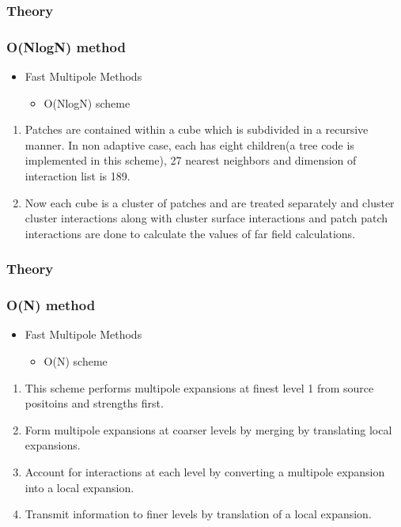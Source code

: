 \documentclass{beamer}
\begin{document}
\begin{frame}
\frametitle{Theory}
\subsubsection{O(NlogN) method}
\begin{itemize}
\item Fast Multipole Methods
\begin{itemize}
\item O(NlogN) scheme
\end{itemize}
\end{itemize}
\begin{enumerate}
\item Patches are contained within a cube which is subdivided in a recursive manner. In non adaptive case, each has eight children(a tree code is implemented in this scheme), 27 nearest neighbors and dimension of interaction list is 189.
\item Now each cube is a cluster of patches and are treated separately and cluster cluster interactions along with cluster surface interactions and patch patch interactions are done to calculate the values of far field calculations.
\end{enumerate}
\end{frame}

\begin{frame}
\frametitle{Theory}
\subsubsection{O(N) method}
\begin{itemize}
\item Fast Multipole Methods
\begin{itemize}
\item O(N) scheme
\end{itemize}
\end{itemize}
\begin{enumerate}
\item This scheme performs multipole expansions at finest level 1 from source positoins and strengths first.
\item Form multipole expansions at coarser levels by merging by translating local expansions.
\item Account for interactions at each level by converting a multipole expansion into a local expansion. 
\item Transmit information to finer levels by translation of a local expansion.
\end{enumerate}
\end{frame}
\end{document}
